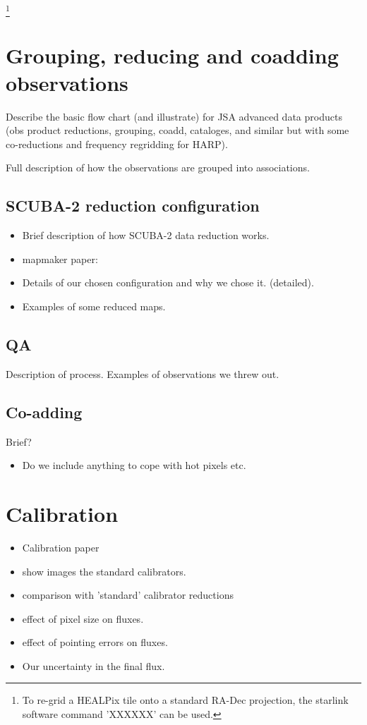 \documentclass[usenatbib]{mn2e}
\begin{document}
\footnote{To re-grid a HEALPix tile onto a standard RA-Dec projection,
the starlink software command 'XXXXXX' can be used.}

\citep{2005ApJ...622..759G}

\citep{2007MNRAS.381..865C}

\section{Grouping, reducing and coadding observations}
Describe the basic flow chart (and illustrate) for JSA advanced data
products (obs product reductions, grouping, coadd, cataloges, and
similar but with some co-reductions and frequency regridding for
HARP).

Full description of how the observations are grouped into
associations.



\subsection{SCUBA-2 reduction configuration}

\citep{2013MNRAS.430.2513H}

\begin{itemize}
\item Brief description of how SCUBA-2 data reduction works.
\item mapmaker paper: \citep{2013MNRAS.430.2545C}
\item Details of our chosen configuration and why we chose it. (detailed).
\item Examples of some reduced maps.
\end{itemize}


\subsection{QA}
Description of process. Examples of observations we threw out.


\subsection{Co-adding}
Brief?
\begin{itemize}
\item Do we include anything to cope with hot pixels etc.
\end{itemize}



\section{Calibration}
\begin{itemize}
\item Calibration paper \citep{2013MNRAS.430.2534D}
\item show images the standard calibrators.
\item comparison with 'standard' calibrator reductions
\item effect of pixel size on fluxes.
\item effect of pointing errors on fluxes.
\item Our uncertainty in the final flux.
\end{itemize}
\end{document}
